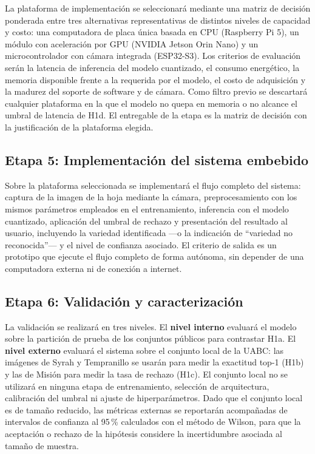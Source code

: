 La plataforma de implementación se seleccionará mediante una matriz de
decisión ponderada entre tres alternativas representativas de distintos
niveles de capacidad y costo: una computadora de placa única basada en CPU
(Raspberry Pi 5), un módulo con aceleración por GPU (NVIDIA Jetson Orin
Nano) y un microcontrolador con cámara integrada (ESP32-S3). Los criterios
de evaluación serán la latencia de inferencia del modelo cuantizado, el
consumo energético, la memoria disponible frente a la requerida por el
modelo, el costo de adquisición y la madurez del soporte de software y de
cámara. Como filtro previo se descartará cualquier plataforma en la que el
modelo no quepa en memoria o no alcance el umbral de latencia de H1d. El
entregable de la etapa es la matriz de decisión con la justificación de la
plataforma elegida.

\subsection{Etapa 5: Implementación del sistema embebido}

Sobre la plataforma seleccionada se implementará el flujo completo del
sistema: captura de la imagen de la hoja mediante la cámara,
preprocesamiento con los mismos parámetros empleados en el entrenamiento,
inferencia con el modelo cuantizado, aplicación del umbral de rechazo y
presentación del resultado al usuario, incluyendo la variedad identificada
—o la indicación de ``variedad no reconocida''— y el nivel de confianza
asociado. El criterio de salida es un prototipo que ejecute el flujo
completo de forma autónoma, sin depender de una computadora externa ni de
conexión a internet.

\subsection{Etapa 6: Validación y caracterización}

La validación se realizará en tres niveles. El \textbf{nivel interno}
evaluará el modelo sobre la partición de prueba de los conjuntos públicos
para contrastar H1a. El \textbf{nivel externo} evaluará el sistema sobre el
conjunto local de la UABC: las imágenes de Syrah y Tempranillo se usarán
para medir la exactitud top-1 (H1b) y las de Misión para medir la tasa de
rechazo (H1c). El conjunto local no se utilizará en ninguna etapa de
entrenamiento, selección de arquitectura, calibración del umbral ni ajuste
de hiperparámetros. Dado que el conjunto local es de tamaño reducido, las
métricas externas se reportarán acompañadas de intervalos de confianza al
95\,\% calculados con el método de Wilson, para que la aceptación o rechazo
de la hipótesis considere la incertidumbre asociada al tamaño de muestra.

